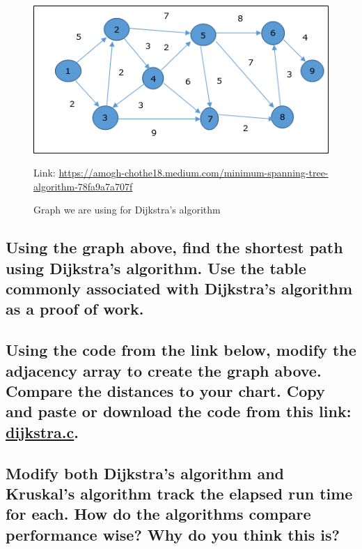 \documentclass{article}
\begin{document}
\begin{figure}[!h]
\includegraphics[width=\linewidth]{dijkstragraph.jpg}
\caption{Graph we are using for Dijkstra's algorithm} Link: \href{https://amogh-chothe18.medium.com/minimum-spanning-tree-algorithm-78fa9a7a707f} {https://amogh-chothe18.medium.com/minimum-spanning-tree-algorithm-78fa9a7a707f}
\end{figure}

\subsection{Using the graph above, find the shortest path using Dijkstra's algorithm. Use the table commonly associated with Dijkstra's algorithm as a proof of work.}

\pagebreak{}

\subsection{Using the code from the link below, modify the adjacency array to create the graph above. Compare the distances to your chart. Copy and paste or download the code from this link: \href{https://github.com/ehawkvu/ds-n-a/blob/master/graphing/dijkstra.c}{dijkstra.c}.}

\vspace{36pt}

\subsection{Modify both Dijkstra's algorithm and Kruskal's algorithm track the elapsed run time for each. How do the algorithms compare performance wise? Why do you think this is?}
\end{document}
